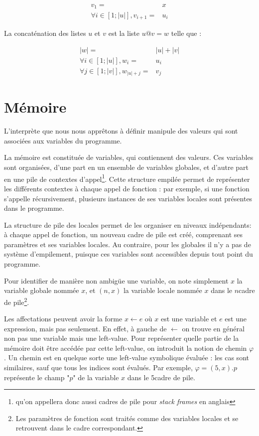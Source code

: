 \begin{align*}
  v_1 = & x \\
  ∀ i ∈ [1; |u|] , v_{i+1} = & u_i
\end{align*}

La concaténation des listes $u$ et $v$ est la liste $u@v = w$ telle que :

\begin{align*}
|w| = & |u| + |v| \\
∀ i ∈ [1 ; |u|] , w_i = & u_i \\
∀ j ∈ [1 ; |v|] , w_{|u| + j} = & v_j
\end{align*}

\section{Mémoire}

L'interprète que nous nous apprêtons à définir manipule des valeurs qui sont
associées aux variables du programme.

La mémoire est constituée de variables, qui contiennent des valeurs. Ces
variables sont organisées, d'une part en un ensemble de variables globales, et
d'autre part en une pile de contextes d'appel\footnote{qu'on appellera donc
aussi cadres de pile pour \emph{stack frames} en anglais}. Cette structure
empilée permet de représenter les différents contextes à chaque appel de
fonction : par exemple, si une fonction s'appelle récursivement, plusieurs
instances de ses variables locales sont présentes dans le programme.

La structure de pile des locales permet de les organiser en niveaux
indépendants: à chaque appel de fonction, un nouveau cadre de pile est créé,
comprenant ses paramètres et ses variables locales. Au contraire, pour les
globales il n'y a pas de système d'empilement, puisque ces variables sont
accessibles depuis tout point du programme.

Pour identifier de manière non ambigüe une variable, on note simplement $x$ la
variable globale nommée $x$, et $(n, x)$ la variable locale nommée $x$ dans le
$n$\ieme cadre de pile\footnote{Les paramètres de fonction sont traités comme
des variables locales et se retrouvent dans le cadre correspondant.}.

Les affectations peuvent avoir la forme $x ← e$ où $x$ est une variable et $e$
est une expression, mais pas seulement. En effet, à gauche de $←$ on trouve en
général non pas une variable mais une left-value. Pour représenter quelle partie
de la mémoire doit être accédée par cette left-value, on introduit la notion de
chemin $φ$. Un chemin est en quelque sorte une left-value symbolique évaluée :
les cas sont similaires, sauf que tous les indices sont évalués. Par exemple, $φ
= (5, x).p$ représente le champ "$p$" de la variable $x$ dans le 5\ieme cadre de
pile.

